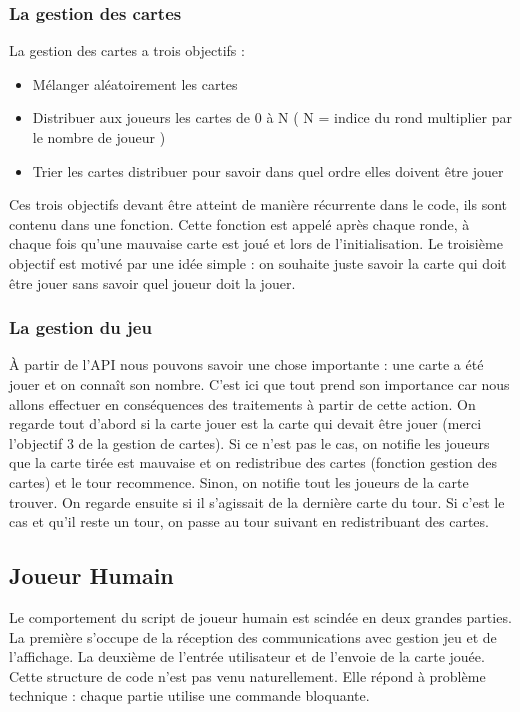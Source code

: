 \documentclass{article}
\begin{document}
\subsubsection{La gestion des cartes}

La gestion des cartes a trois objectifs :

\begin{itemize}
	\item Mélanger aléatoirement les cartes
	\item Distribuer aux joueurs les cartes de 0 à N ( N = indice du rond multiplier par le nombre de joueur )
	\item Trier les cartes distribuer pour savoir dans quel ordre elles doivent être jouer
\end{itemize}

Ces trois objectifs devant être atteint de manière récurrente dans le code, ils sont contenu dans une fonction. Cette fonction est appelé après chaque ronde, à chaque fois qu'une mauvaise carte est joué et lors de l'initialisation. 
\newline
\newline
Le troisième objectif est motivé par une idée simple : on souhaite juste savoir la carte qui doit être jouer sans savoir quel joueur doit la jouer. 

\subsubsection{La gestion du jeu}

À partir de l'API nous pouvons savoir une chose importante : 
une carte a été jouer et on connaît son nombre. C'est ici que tout prend son importance car nous allons effectuer en conséquences des traitements à partir de cette action.\newline
On regarde tout d'abord si la carte jouer est la carte qui devait être jouer (merci l'objectif 3 de la gestion de cartes). Si ce n'est pas le cas, on notifie les joueurs que la carte tirée est mauvaise et on redistribue des cartes (fonction gestion des cartes) et le tour recommence. Sinon, on notifie tout les joueurs de la carte trouver. On regarde ensuite si il s'agissait de la dernière carte du tour. Si c'est le cas et qu'il reste un tour, on passe au tour suivant en redistribuant des cartes. 

\subsection{Joueur Humain}
Le comportement du script de joueur humain est scindée en deux grandes parties. La première s'occupe de la réception des communications avec gestion jeu et de l'affichage. La deuxième de l'entrée utilisateur et de l'envoie de la carte jouée. Cette structure de code n'est pas venu naturellement. Elle répond à problème technique : chaque partie utilise une commande bloquante. 
\end{document}

